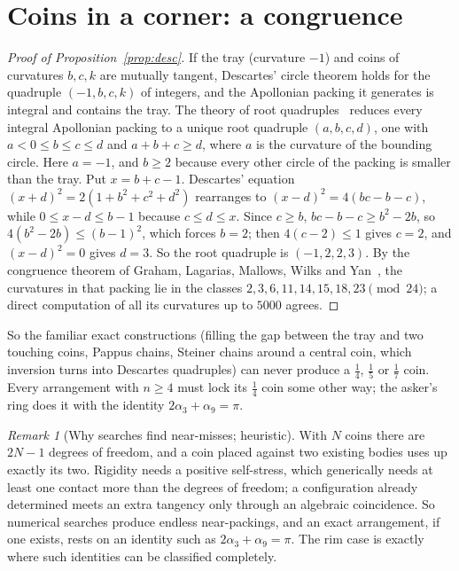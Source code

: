 \documentclass[11pt]{amsart}
\theoremstyle{remark}
\newtheorem{remark}[theorem]{Remark}
\begin{document}
\section{Coins in a corner: a congruence}

\begin{proof}[Proof of Proposition~\ref{prop:desc}]
If the tray (curvature $-1$) and coins of curvatures $b,c,k$ are mutually tangent, Descartes' circle theorem holds for the quadruple $(-1,b,c,k)$ of integers, and the Apollonian packing it generates is integral and contains the tray. The theory of root quadruples~\cite{GLMWY} reduces every integral Apollonian packing to a unique root quadruple $(a,b,c,d)$, one with $a<0\le b\le c\le d$ and $a+b+c\ge d$, where $a$ is the curvature of the bounding circle. Here $a=-1$, and $b\ge2$ because every other circle of the packing is smaller than the tray. Put $x=b+c-1$. Descartes' equation $(x+d)^2=2(1+b^2+c^2+d^2)$ rearranges to $(x-d)^2=4(bc-b-c)$, while $0\le x-d\le b-1$ because $c\le d\le x$. Since $c\ge b$, $bc-b-c\ge b^2-2b$, so $4(b^2-2b)\le(b-1)^2$, which forces $b=2$; then $4(c-2)\le1$ gives $c=2$, and $(x-d)^2=0$ gives $d=3$. So the root quadruple is $(-1,2,2,3)$. By the congruence theorem of Graham, Lagarias, Mallows, Wilks and Yan~\cite{GLMWY}, the curvatures in that packing lie in the classes $2,3,6,11,14,15,18,23\pmod{24}$; a direct computation of all its curvatures up to $5000$ agrees.
\end{proof}

So the familiar exact constructions (filling the gap between the tray and two touching coins, Pappus chains, Steiner chains around a central coin, which inversion turns into Descartes quadruples) can never produce a $\frac14$, $\frac15$ or $\frac17$ coin. Every arrangement with $n\ge4$ must lock its $\frac14$ coin some other way; the asker's ring does it with the identity $2\alpha_3+\alpha_9=\pi$.

\begin{remark}[Why searches find near-misses; heuristic]
With $N$ coins there are $2N-1$ degrees of freedom, and a coin placed against two existing bodies uses up exactly its two. Rigidity needs a positive self-stress, which generically needs at least one contact more than the degrees of freedom; a configuration already determined meets an extra tangency only through an algebraic coincidence. So numerical searches produce endless near-packings, and an exact arrangement, if one exists, rests on an identity such as $2\alpha_3+\alpha_9=\pi$. The rim case is exactly where such identities can be classified completely.
\end{remark}
\end{document}
